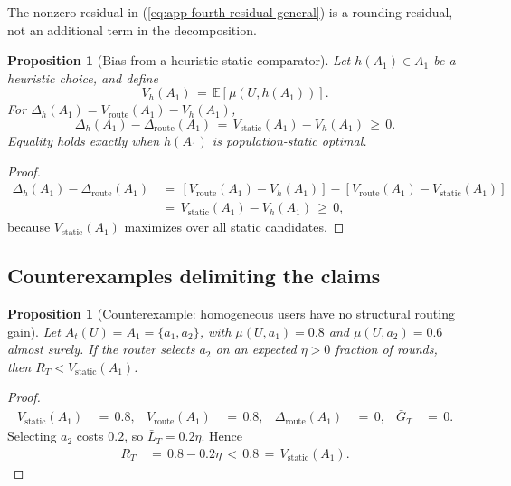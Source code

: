 \documentclass{article} %
\newtheorem{proposition}[theorem]{Proposition}
\renewcommand{\eqref}[1]{\textup{(\ref{#1})}}
\begin{document}
The nonzero residual in \eqref{eq:app-fourth-residual-general} is a rounding residual, not an additional term in the decomposition.

\begin{proposition}[Bias from a heuristic static comparator]
\label{prop:7}
Let \(h(A_1)\in A_1\) be a heuristic choice, and define
\begin{equation}
V_h(A_1)
\,=\,
\mathbb{E}[\mu(U,h(A_1))].
\end{equation}
For \(\Delta_h(A_1)=V_{\mathrm{route}}(A_1)-V_h(A_1)\),
\begin{equation}
\Delta_h(A_1)
-
\Delta_{\mathrm{route}}(A_1)
\,=\,
V_{\mathrm{static}}(A_1)-V_h(A_1)
\,\geq\,
0.
\end{equation}
Equality holds exactly when \(h(A_1)\) is population-static optimal.
\end{proposition}

\begin{proof}
\begin{equation}
\begin{aligned}
\Delta_h(A_1)
-
\Delta_{\mathrm{route}}(A_1)
&\,=\,
\left[
V_{\mathrm{route}}(A_1)-V_h(A_1)
\right]
-
\left[
V_{\mathrm{route}}(A_1)-V_{\mathrm{static}}(A_1)
\right]
\\
&\,=\,
V_{\mathrm{static}}(A_1)
-
V_h(A_1)
\,\geq\,0,
\end{aligned}
\end{equation}
because \(V_{\mathrm{static}}(A_1)\) maximizes over all static candidates.
\end{proof}

\subsection{Counterexamples delimiting the claims}

\begin{proposition}[Counterexample: homogeneous users have no structural routing gain]
\label{prop:8}
Let \(A_t(U)=A_1=\{a_1,a_2\}\), with
\(\mu(U,a_1)=0.8\) and \(\mu(U,a_2)=0.6\) almost surely.  If the router selects
\(a_2\) on an expected \(\eta>0\) fraction of rounds, then
\(R_T<V_{\mathrm{static}}(A_1)\).
\end{proposition}

\begin{proof}
\begin{equation}
\begin{aligned}
V_{\mathrm{static}}(A_1)
&\,=\,0.8, &
V_{\mathrm{route}}(A_1)
&\,=\,0.8, &
\Delta_{\mathrm{route}}(A_1)
&\,=\,0, &
\bar G_T
&\,=\,0.
\end{aligned}
\end{equation}
Selecting \(a_2\) costs \(0.2\), so \(\bar L_T=0.2\eta\).  Hence
\begin{equation}
\begin{aligned}
R_T
&\,=\,0.8-0.2\eta
\,<\,0.8
\,=\,V_{\mathrm{static}}(A_1).
\end{aligned}
\end{equation}
\end{proof}
\end{document}

